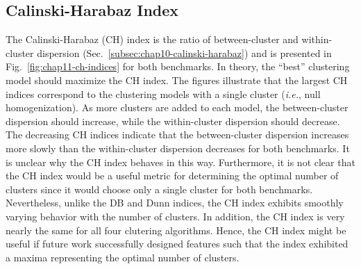 \clearpage

\subsection{Calinski-Harabaz Index}
\label{subsec:chap11-ch-index}

The Calinski-Harabaz (CH) index is the ratio of between-cluster and within-cluster dispersion (Sec.~\ref{subsec:chap10-calinski-harabaz}) and is presented in Fig.~\ref{fig:chap11-ch-indices} for both benchmarks. In theory, the ``best'' clustering model should maximize the CH index. The figures illustrate that the largest CH indices correspond to the clustering models with a single cluster (\textit{i.e.}, null homogenization). As more clusters are added to each model, the between-cluster dispersion should increase, while the within-cluster dispersion should decrease. The decreasing CH indices indicate that the between-cluster dispersion increases more slowly than the within-cluster dispersion decreases for both benchmarks. It is unclear why the CH index behaves in this way. Furthermore, it is not clear that the CH index would be a useful metric for determining the optimal number of clusters since it would choose only a single cluster for both benchmarks. Nevertheless, unlike the DB and Dunn indices, the CH index exhibits smoothly varying behavior with the number of clusters. In addition, the CH index is very nearly the same for all four clutering algorithms. Hence, the CH index might be useful if future work successfully designed  features such that the index exhibited a maxima representing the optimal number of clusters.

